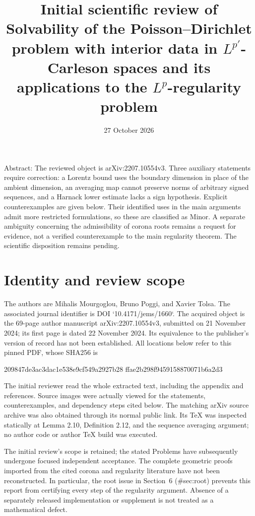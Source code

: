 \documentclass[10pt]{article}
\title{Initial scientific review of
Solvability of the Poisson–Dirichlet problem
with interior data in \(L^{p'}\)-Carleson spaces
and its applications to the \(L^p\)-regularity problem}
\author{}
\date{27 October 2026}
\begin{document}
\maketitle
Abstract: The reviewed object is arXiv:2207.10554v3. Three auxiliary statements require correction: a Lorentz bound uses the boundary dimension in place of the ambient dimension, an averaging map cannot preserve norms of arbitrary signed sequences, and a Harnack lower estimate lacks a sign hypothesis. Explicit counterexamples are given below. Their identified uses in the main arguments admit more restricted formulations, so these are classified as Minor. A separate ambiguity concerning the admissibility of corona roots remains a request for evidence, not a verified counterexample to the main regularity theorem. The scientific disposition remains pending.\par
\section*{Identity and review scope}
The authors are Mihalis Mourgoglou, Bruno Poggi, and Xavier Tolsa. The associated journal identifier is DOI `10.4171/jems/1660`. The acquired object is the 69-page author manuscript arXiv:2207.10554v3, submitted on 21 November 2024; its first page is dated 22 November 2024. Its equivalence to the publisher’s version of record has not been established. All locations below refer to this pinned PDF, whose SHA256 is\par
209847de3ac3dac1e538e9cf549a2927b28
ffae2b298f9459158870071b6a2d3\par
The initial reviewer read the whole extracted text, including the appendix and references. Source images were actually viewed for the statements, counterexamples, and dependency steps cited below. The matching arXiv source archive was also obtained through its normal public link. Its TeX was inspected statically at Lemma 2.10, Definition 2.12, and the sequence averaging argument; no author code or author TeX build was executed.\par
The initial review’s scope is retained; the stated Problems have subsequently undergone focused independent acceptance. The complete geometric proofs imported from the cited corona and regularity literature have not been reconstructed. In particular, the root issue in Section 6 (\#sec:root) prevents this report from certifying every step of the regularity argument. Absence of a separately released implementation or supplement is not treated as a mathematical defect.\par
\end{document}

